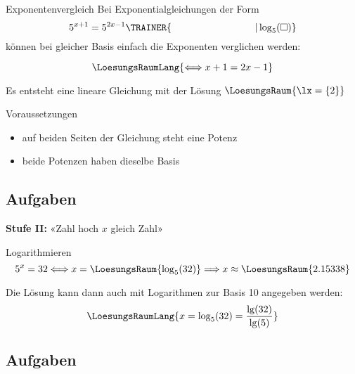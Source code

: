 \begin{rezept}{Exponentenvergleich}{}
Bei Exponentialgleichungen der Form $$5^{x+1} =
5^{2x-1}\TRAINER{\hspace{30mm}| \log_5(\Box{})}$$ können bei
gleicher Basis einfach die Exponenten verglichen werden:

$$\LoesungsRaumLang{\Longleftrightarrow x+1=2x-1}$$


Es entsteht eine lineare Gleichung mit der Lösung $\LoesungsRaum{\lx = \{2\}}$
\end{rezept}

\begin{bemerkung}{Voraussetzungen}{}
  \begin{itemize}
  \item auf beiden Seiten der Gleichung steht eine Potenz
  \item beide Potenzen haben dieselbe Basis
    \end{itemize}
\end{bemerkung}
\newpage


\subsection*{Aufgaben}

\newpage
\textbf{Stufe II:} «Zahl hoch $x$ gleich Zahl»


\begin{rezept}{Logarithmieren}{}
$$5^x=32 \Longleftrightarrow x=\LoesungsRaum{\log_5(32)} \Longrightarrow x \approx \LoesungsRaum{2.15338}$$

Die Lösung kann dann auch mit Logarithmen zur Basis 10 angegeben
werden:
$$\LoesungsRaumLang{x = \log_5(32) = \frac{\lg(32)}{\lg(5)}}$$
\end{rezept}


\subsection*{Aufgaben}



